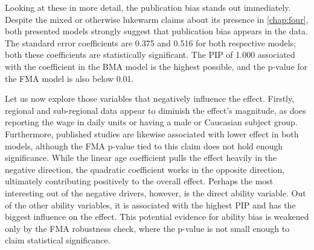 {\begin{singlespace}
\begin{notsotiny}
\end{notsotiny}
\end{singlespace}
\clearpage
}

Looking at these in more detail, the publication bias stands out immediately. Despite the mixed or otherwise lukewarm claims about its presence in \autoref{chap:four}, both presented models strongly suggest that publication bias appears in the data. The standard error coefficients are 0.375 and 0.516 for both respective models; both these coefficients are statistically significant. The \ac{PIP} of 1.000 associated with the coefficient in the \ac{BMA} model is the highest possible, and the p-value for the \ac{FMA} model is also below 0.01.

Let us now explore those variables that negatively influence the effect. Firstly, regional and sub-regional data appear to diminish the effect's magnitude, as does reporting the wage in daily units or having a male or Caucasian subject group. Furthermore, published studies are likewise associated with lower effect in both models, although the \ac{FMA} p-value tied to this claim does not hold enough significance. While the linear age coefficient pulls the effect heavily in the negative direction, the quadratic coefficient works in the opposite direction, ultimately contributing positively to the overall effect. Perhaps the most interesting out of the negative drivers, however, is the direct ability variable. Out of the other ability variables, it is associated with the highest \ac{PIP} and has the biggest influence on the effect. This potential evidence for ability bias is weakened only by the \ac{FMA} robustness check, where the p-value is not small enough to claim statistical significance.


